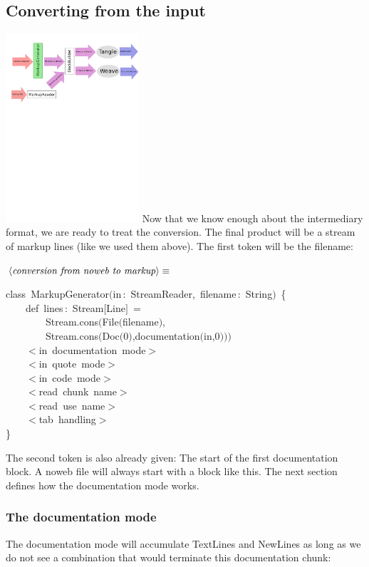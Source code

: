 \documentclass[a4paper,12pt]{article}
\begin{document}
\subsection{Converting from the input}

\includegraphics[viewport=0 500 264 800,clip,height=7cm]{images/markupGenerator.pdf}
Now that we know enough about the intermediary format, we are ready to
treat the conversion. The final product will be a stream of markup lines
(like we used them above). The first token will be the filename:

$\left<\mbox{\emph{conversion from noweb to markup}}\right>\equiv$
\begin{program}{\vem class}~MarkupGenerator$($in\,{\rm :}~StreamReader,~filename\,{\rm :}~String$)$~{\small\{}
\\~~~~{\vem def}~lines\,{\rm :}~Stream$[$Line$]$~=
\\~~~~~~~~Stream.cons$($File$($filename$)$,
\\~~~~~~~~Stream.cons$($Doc$($0$)$,documentation$($in,0$)$$)$$)$
\\~~~~$<$in~documentation~mode$>$
\\~~~~$<$in~quote~mode$>$
\\~~~~$<$in~code~mode$>$
\\[0.5em]~~~~$<$read~chunk~name$>$
\\~~~~$<$read~use~name$>$
\\[0.5em]~~~~$<$tab~handling$>$
\\{\small\}}
\\[0.5em]\end{program}
The second token is also already given: The start of the first documentation
block. A noweb file will always start with a block like this. The next section
defines how the documentation mode works.

\subsubsection{The documentation mode}
The documentation mode will accumulate TextLines and NewLines as long as we
do not see a combination that would terminate this documentation chunk:
\end{document}
